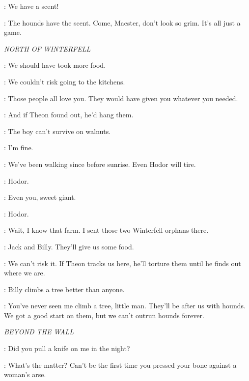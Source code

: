 
\DAGMER: We have a scent!

\THEON: The hounds have the scent. Come, Maester, don't look so grim. It's all just a game.


\scene

\textit{NORTH OF WINTERFELL}


\OSHA: We should have took more food.

\BRAN: We couldn't risk going to the kitchens.

\OSHA: Those people all love you. They would have given you whatever you needed.

\BRAN: And if Theon found out, he'd hang them.

\OSHA: The boy can't survive on walnuts.

\RICKON: I'm fine.

\OSHA: We've been walking since before sunrise. Even Hodor will tire.

\HODOR: Hodor.

\OSHA: Even you, sweet giant.

\HODOR:  Hodor.


\BRAN: Wait, I know that farm. I sent those two Winterfell orphans there.

\RICKON: Jack and Billy. They'll give us some food.

\BRAN: We can't risk it. If Theon tracks us here, he'll torture them until he finds out where we are.

\RICKON: Billy climbs a tree better than anyone.

\OSHA: You've never seen me climb a tree, little man. They'll be after us with hounds. We got a good start on them, but we can't outrun hounds forever.



\scene

\textit{BEYOND THE WALL}


\YGRITTE: Did you pull a knife on me in the night?


\YGRITTE: What's the matter? Can't be the first time you pressed your bone against a woman's arse.

